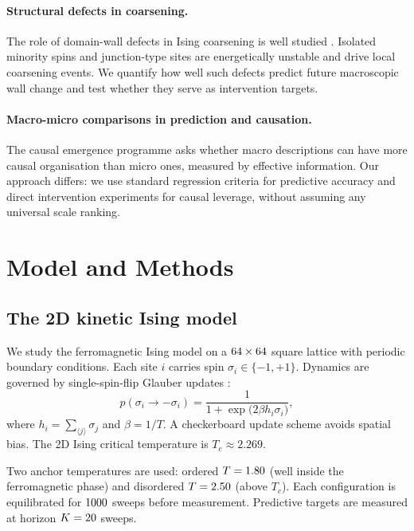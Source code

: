 \documentclass[11pt,a4paper]{article}
\begin{document}
\paragraph{Structural defects in coarsening.}
The role of domain-wall defects in Ising coarsening is well studied
\citep{bray1994,spirin2001}.
Isolated minority spins and junction-type sites are energetically
unstable and drive local coarsening events.
We quantify how well such defects predict future macroscopic wall change
and test whether they serve as intervention targets.

\paragraph{Macro-micro comparisons in prediction and causation.}
The causal emergence programme \citep{hoel2013,hoel2017} asks whether
macro descriptions can have more causal organisation than micro ones,
measured by effective information.
Our approach differs: we use standard regression criteria for predictive
accuracy and direct intervention experiments for causal leverage, without
assuming any universal scale ranking.

\section{Model and Methods}
\label{sec:model}

\subsection{The 2D kinetic Ising model}

We study the ferromagnetic Ising model on a
$64 \times 64$ square lattice with periodic boundary conditions.
Each site $i$ carries spin $\sigma_i \in \{-1,+1\}$.
Dynamics are governed by single-spin-flip Glauber updates \citep{glauber1963}:
\begin{equation}
p(\sigma_i \to -\sigma_i)
= \frac{1}{1 + \exp\!\bigl(2\beta h_i \sigma_i\bigr)},
\label{eq:glauber}
\end{equation}
where $h_i = \sum_{\langle j\rangle}\sigma_j$ and $\beta = 1/T$.
A checkerboard update scheme avoids spatial bias.
The 2D Ising critical temperature is $T_c \approx 2.269$.

Two anchor temperatures are used: ordered $T = 1.80$ (well inside
the ferromagnetic phase) and disordered $T = 2.50$ (above $T_c$).
Each configuration is equilibrated for $1000$ sweeps before measurement.
Predictive targets are measured at horizon $K = 20$ sweeps.
\end{document}
